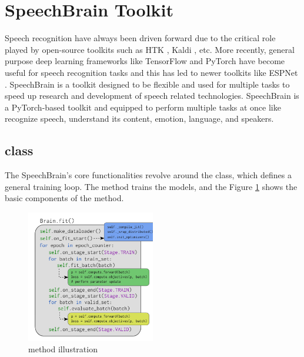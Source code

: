 \section{SpeechBrain Toolkit}
Speech recognition have always been driven forward due to the critical role played by open-source toolkits such as HTK \cite{Young1995TheBook}, Kaldi \cite{PoveyTheToolkit}, etc. More recently, general purpose deep learning frameworks like TensorFlow \cite{AbadiTensorFlow:Systems} and PyTorch \cite{Paszke2019PyTorch:Library} have become useful for speech recognition tasks and this has led to newer toolkits like ESPNet \cite{Watanabe2018ESPnet:Toolkit}. SpeechBrain \cite{RavanelliSpeechBrain:Toolkit} is a toolkit designed to be flexible and used for multiple tasks to speed up research and development of speech related technologies.  SpeechBrain is a PyTorch-based toolkit and equipped to perform multiple tasks at once like recognize speech, understand its content, emotion, language, and speakers. 

\subsection{ class}
The SpeechBrain's core functionalities revolve around the  class, which defines a general training loop. The  method trains the models, and the Figure \ref{fig:brain} shows the basic components of the method. 

\begin{figure}[ht]
  \begin{center}
    \includegraphics[width=0.5\textwidth]{images/brainclass.png} 
    \caption{ method illustration \cite{RavanelliSpeechBrain:Toolkit}}
    \label{fig:brain}
  \end{center}
\end{figure}

